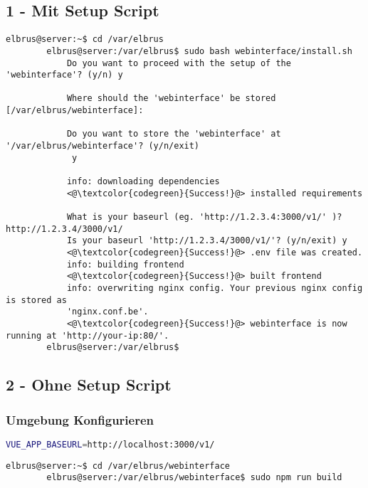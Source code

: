 	\subsection{1 - Mit Setup Script}
	
	\lstset{style=commands}
	\begin{lstlisting}[caption={Ausführen des 'install.sh' Scripts.}]
		elbrus@server:~$ cd /var/elbrus
		elbrus@server:/var/elbrus$ sudo bash webinterface/install.sh
			Do you want to proceed with the setup of the 'webinterface'? (y/n) y
			
			Where should the 'webinterface' be stored [/var/elbrus/webinterface]:
			
			Do you want to store the 'webinterface' at '/var/elbrus/webinterface'? (y/n/exit)
			 y
			
			info: downloading dependencies
			<@\textcolor{codegreen}{Success!}@> installed requirements
			
			What is your baseurl (eg. 'http://1.2.3.4:3000/v1/' )? http://1.2.3.4/3000/v1/
			Is your baseurl 'http://1.2.3.4/3000/v1/'? (y/n/exit) y
			<@\textcolor{codegreen}{Success!}@> .env file was created.
			info: building frontend
			<@\textcolor{codegreen}{Success!}@> built frontend
			info: overwriting nginx config. Your previous nginx config is stored as
			'nginx.conf.be'.
			<@\textcolor{codegreen}{Success!}@> webinterface is now running at 'http://your-ip:80/'.
		elbrus@server:/var/elbrus$
	\end{lstlisting}
	\newpage
	
	\subsection{2 - Ohne Setup Script}
	
	\subsubsection[file config]{Umgebung Konfigurieren}
	\lstset{style=files}
	\begin{lstlisting}[caption={Anhand von '.env.example' eigene '.env' Datei anlegen.}, language=bash, keywords={CONFIGPATH, MAINPATH}, keywordstyle=\color{red}]
		VUE_APP_BASEURL=http://localhost:3000/v1/
	\end{lstlisting}
	
	\lstset{style=commands}
	\begin{lstlisting}[caption={Compilieren des Webinterface.}]
		elbrus@server:~$ cd /var/elbrus/webinterface
		elbrus@server:/var/elbrus/webinterface$ sudo npm run build
	\end{lstlisting}

